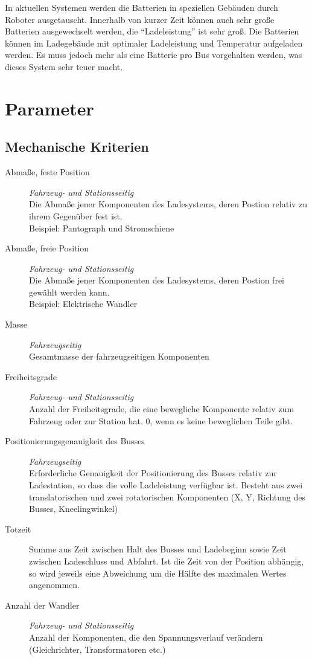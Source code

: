 In aktuellen Systemen werden die Batterien in speziellen Gebäuden durch Roboter ausgetauscht. Innerhalb von kurzer Zeit können auch sehr große Batterien ausgewechselt werden, die "`Ladeleistung"' ist sehr groß. Die Batterien können im Ladegebäude mit optimaler Ladeleistung und Temperatur aufgeladen werden. Es muss jedoch mehr als eine Batterie pro Bus vorgehalten werden, was dieses System sehr teuer macht.


\section{Parameter}

\subsection{Mechanische Kriterien}
\begin{description}
	\item [Abmaße, feste Position] \emph{Fahrzeug- und Stationsseitig}\\
	Die Abmaße jener Komponenten des Ladesystems, deren Postion relativ zu ihrem Gegenüber fest ist.\\
	Beispiel: Pantograph und Stromschiene
	\item [Abmaße, freie Position] \emph{Fahrzeug- und Stationsseitig}\\
	Die Abmaße jener Komponenten des Ladesystems, deren Postion frei gewählt werden kann.\\
	Beispiel: Elektrische Wandler
	\item [Masse] \emph{Fahrzeugseitig}\\
	Gesamtmasse der fahrzeugseitigen Komponenten
	\item [Freiheitsgrade] \emph{Fahrzeug- und Stationsseitig}\\
	Anzahl der Freiheitsgrade, die eine bewegliche Komponente relativ zum Fahrzeug oder zur Station hat. 0, wenn es keine beweglichen Teile gibt.
	\item [Positionierungsgenauigkeit des Busses] \emph{Fahrzeugseitig} \\
	Erforderliche Genauigkeit der Positionierung des Busses relativ zur Ladestation, so dass die volle Ladeleistung verfügbar ist. Besteht aus zwei translatorischen und zwei rotatorischen Komponenten (X, Y, Richtung des Busses, Kneelingwinkel)
	\item [Totzeit]
	Summe aus Zeit zwischen Halt des Busses und Ladebeginn sowie Zeit zwischen Ladeschluss und Abfahrt. Ist die Zeit von der Position abhängig, so wird jeweils eine Abweichung um die Hälfte des maximalen Wertes angenommen.
	\item [Anzahl der Wandler] \emph{Fahrzeug- und Stationsseitig}\\
	Anzahl der Komponenten, die den Spannungsverlauf verändern (Gleichrichter, Transformatoren etc.)
\end{description}

